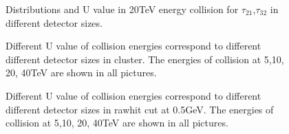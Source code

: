 \label{sec:Mann Whitney U test}


\begin{figure}
\begin{center}

\end{center}
\caption{Distributions and U value in 20TeV energy collision for $\tau_{21}$,$\tau_{32}$ in different detector sizes.}
\label{fig:cluster_tau21_tau32}
\end{figure}


\begin{figure}
\begin{center}
\end{center}
\caption{Different U value of collision energies correspond to different different detector sizes in cluster. The energies of collision at 5,10, 20, 40TeV are shown in all pictures.}
\label{fig:cluster_U_summary}
\end{figure}


\begin{figure}
\begin{center}
\end{center}
\caption{Different U value of collision energies correspond to different different detector sizes in rawhit cut at 0.5GeV. The energies of collision at 5,10, 20, 40TeV are shown in all pictures.}
\label{fig:raw_U_summary}
\end{figure}

